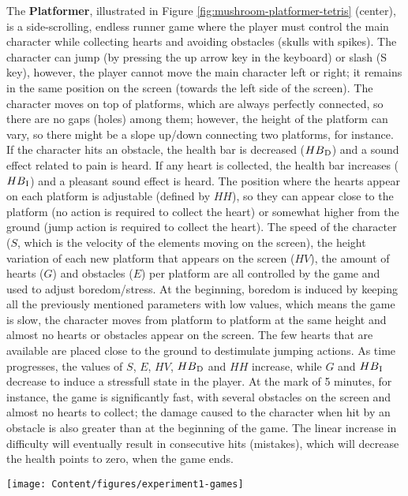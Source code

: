 The \textbf{Platformer}, illustrated in Figure \ref{fig:mushroom-platformer-tetris} (center), is a side-scrolling, endless runner game where the player must control the main character while collecting hearts and avoiding obstacles (skulls with spikes). The character can jump (by pressing the up arrow key in the keyboard) or slash (S key), however, the player cannot move the main character left or right; it remains in the same position on the screen (towards the left side of the screen). The character moves on top of platforms, which are always perfectly connected, so there are no gaps (holes) among them; however, the height of the platform can vary, so there might be a slope up/down connecting two platforms, for instance. If the character hits an obstacle, the health bar is decreased ($HB\textsubscript{D}$) and a sound effect related to pain is heard. If any heart is collected, the health bar increases ($HB\textsubscript{I}$) and a pleasant sound effect is heard. The position where the hearts appear on each platform is adjustable (defined by $HH$), so they can appear close to the platform (no action is required to collect the heart) or somewhat higher from the ground (jump action is required to collect the heart). The speed of the character ($S$, which is the velocity of the elements moving on the screen), the height variation of each new platform that appears on the screen ($HV$), the amount of hearts ($G$) and obstacles ($E$) per platform are all controlled by the game and used to adjust boredom/stress. At the beginning, boredom is induced by keeping all the previously mentioned parameters with low values, which means the game is slow, the character moves from platform to platform at the same height and almost no hearts or obstacles appear on the screen. The few hearts that are available are placed close to the ground to destimulate jumping actions. As time progresses, the values of $S$, $E$, $HV$, $HB\textsubscript{D}$ and $HH$ increase, while $G$ and $HB\textsubscript{I}$ decrease to induce a stressfull state in the player. At the mark of 5 minutes, for instance, the game is significantly fast, with several obstacles on the screen and almost no hearts to collect; the damage caused to the character when hit by an obstacle is also greater than at the beginning of the game. The linear increase in difficulty will eventually result in consecutive hits (mistakes), which will decrease the health points to zero, when the game ends.

\begin{figure*}[!h]
\centering
\texttt{[image: Content/figures/experiment1-games]}
\caption{Mushroom (left), Platformer (center) and Tetris (right). In Mushroom, player has to drag and drop the correct mushrooms into the character, discarding the wrong ones into the trash. In Platformer, the player has to jump over or slide under obstacles while collecting hearts. In our version of Tetris, there are no hints about the next piece to be added to the screen}
\label{fig:mushroom-platformer-tetris}
\end{figure*}

